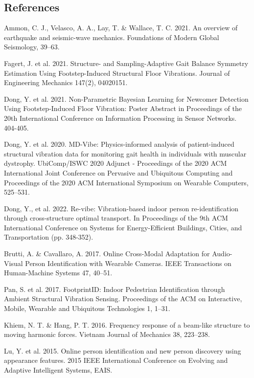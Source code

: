 \documentclass[11pt,letter]{article}
\begin{document}
\begin{multicols*}{2}
\section{References}
{\fontsize{9pt}{11pt}\selectfont
[1] Ammon, C. J., Velasco, A. A., Lay, T. \& Wallace, T. C. 2021. An overview of earthquake and seismic-wave mechanics. Foundations of Modern Global Seismology, 39–63. \par
[2] Fagert, J. et al. 2021. Structure- and Sampling-Adaptive Gait Balance Symmetry Estimation Using Footstep-Induced Structural Floor Vibrations. Journal of Engineering Mechanics 147(2), 04020151. \par
[3] Dong, Y. et al. 2021. Non-Parametric Bayesian Learning for Newcomer Detection Using Footstep-Induced Floor Vibration: Poster Abstract in Proceedings of the 20th International Conference on Information Processing in Sensor Networks. 404-405. \par
[4] Dong, Y. et al. 2020. MD-Vibe: Physics-informed analysis of patient-induced structural vibration data for monitoring gait health in individuals with muscular dystrophy. UbiComp/ISWC 2020 Adjunct - Proceedings of the 2020 ACM International Joint Conference on Pervasive and Ubiquitous Computing and Proceedings of the 2020 ACM International Symposium on Wearable Computers, 525–531. \par
[5] Dong, Y., et al. 2022. Re-vibe: Vibration-based indoor person re-identification through cross-structure optimal transport. In Proceedings of the 9th ACM International Conference on Systems for Energy-Efficient Buildings, Cities, and Transportation (pp. 348-352).\par
[6] Brutti, A. \& Cavallaro, A. 2017. Online Cross-Modal Adaptation for Audio-Visual Person Identification with Wearable Cameras. IEEE Transactions on Human-Machine Systems 47, 40–51.\par
[7] Pan, S. et al. 2017. FootprintID: Indoor Pedestrian Identification through Ambient Structural Vibration Sensing. Proceedings of the ACM on Interactive, Mobile, Wearable and Ubiquitous Technologies 1, 1–31. \par
[8] Khiem, N. T. \& Hang, P. T. 2016. Frequency response of a beam-like structure to moving harmonic forces. Vietnam Journal of Mechanics 38, 223–238. \par 
[9] Lu, Y. et al. 2015. Online person identification and new person discovery using appearance features. 2015 IEEE International Conference on Evolving and Adaptive Intelligent Systems, EAIS.\par  
}
\end{multicols*}
\end{document}
